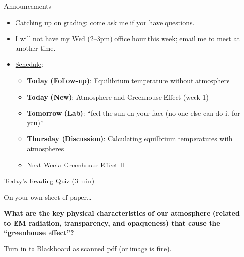 \documentclass[12pt]{beamer}
\title%
{}
\subtitle
{} %
\author%
{Ben Holder}%
\date%
{}
\begin{document}

\begin{frame}{Announcements}
	\begin{itemize}
	\addtolength{\itemsep}{0.5\baselineskip}
	\item Catching up on grading: come ask me if you have questions.
	\item I will not have my Wed (2--3pm) office hour this week; email me to meet at another time.
	\item \underline{Schedule}:
		\begin{itemize}
		\item[]{\bf Today (Follow-up)}: Equilibrium temperature without atmosphere
		\item[]{\bf Today (New)}: Atmosphere and Greenhouse Effect (week 1)
		\item[]{\bf Tomorrow (Lab)}: ``feel the sun on your face (no one else can do it for you)''
		\item[]{\bf Thursday (Discussion)}: Calculating equilbrium temperatures with atmospheres
		\item Next Week: Greenhouse Effect II
		\end{itemize}
	\end{itemize}

\end{frame}
\begin{frame}{Today's Reading Quiz (3 min)}


	
\vspace{1cm}

On your own sheet of paper\ldots

\vspace{0.5cm}

{\bf What are the key physical characteristics of our atmosphere (related to EM radiation, transparency, and opaqueness)  that cause the ``greenhouse effect''?}

\vspace{0.5cm}

Turn in to Blackboard as scanned pdf (or image is fine).

\end{frame}
\end{document}
